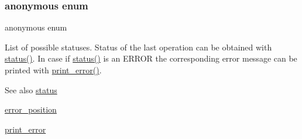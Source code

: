 \subsubsection{\texorpdfstring{anonymous enum}{anonymous enum}}
{\footnotesize\ttfamily anonymous enum}

List of possible statuses. Status of the last operation can be obtained with \hyperlink{class_xml_tools_1_1_evaluator_af9265974643b0e1b1411ef5cea2b8580}{status()}. In case if \hyperlink{class_xml_tools_1_1_evaluator_af9265974643b0e1b1411ef5cea2b8580}{status()} is an E\+R\+R\+OR the corresponding error message can be printed with \hyperlink{class_xml_tools_1_1_evaluator_a35b8445b51d7c045e4027aa55e1ddcae}{print\+\_\+error()}.

\begin{DoxySeeAlso}{See also}
\hyperlink{class_xml_tools_1_1_evaluator_af9265974643b0e1b1411ef5cea2b8580}{status} 

\hyperlink{class_xml_tools_1_1_evaluator_a2df5fb8050eeabce30ea87b8e211612a}{error\+\_\+position} 

\hyperlink{class_xml_tools_1_1_evaluator_a35b8445b51d7c045e4027aa55e1ddcae}{print\+\_\+error} 
\end{DoxySeeAlso}
